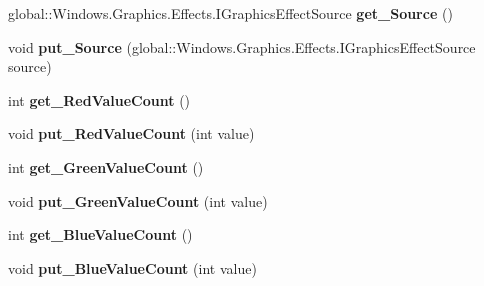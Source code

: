 \begin{DoxyCompactItemize}
global\+::\+Windows.\+Graphics.\+Effects.\+I\+Graphics\+Effect\+Source {\bfseries get\+\_\+\+Source} ()
\item 
\mbox{\label{interface_microsoft_1_1_graphics_1_1_canvas_1_1_effects_1_1_i_posterize_effect_a543f2c579f0144304e21973d15de997a}} 
void {\bfseries put\+\_\+\+Source} (global\+::\+Windows.\+Graphics.\+Effects.\+I\+Graphics\+Effect\+Source source)
\item 
\mbox{\label{interface_microsoft_1_1_graphics_1_1_canvas_1_1_effects_1_1_i_posterize_effect_a5260ca6c96d8f98738514377bc0e68fd}} 
int {\bfseries get\+\_\+\+Red\+Value\+Count} ()
\item 
\mbox{\label{interface_microsoft_1_1_graphics_1_1_canvas_1_1_effects_1_1_i_posterize_effect_a265ff7db0fe2c42877b0078b06751fce}} 
void {\bfseries put\+\_\+\+Red\+Value\+Count} (int value)
\item 
\mbox{\label{interface_microsoft_1_1_graphics_1_1_canvas_1_1_effects_1_1_i_posterize_effect_acd9942aba27fe9a434f9fa185bff2fa1}} 
int {\bfseries get\+\_\+\+Green\+Value\+Count} ()
\item 
\mbox{\label{interface_microsoft_1_1_graphics_1_1_canvas_1_1_effects_1_1_i_posterize_effect_ac09d8d848260691f6e42b706aa4e2497}} 
void {\bfseries put\+\_\+\+Green\+Value\+Count} (int value)
\item 
\mbox{\label{interface_microsoft_1_1_graphics_1_1_canvas_1_1_effects_1_1_i_posterize_effect_a2b8b4bb5ea06b55ec3fcbc262748c566}} 
int {\bfseries get\+\_\+\+Blue\+Value\+Count} ()
\item 
\mbox{\label{interface_microsoft_1_1_graphics_1_1_canvas_1_1_effects_1_1_i_posterize_effect_acb054082d410566df8555984b43083e3}} 
void {\bfseries put\+\_\+\+Blue\+Value\+Count} (int value)

\end{DoxyCompactItemize}
